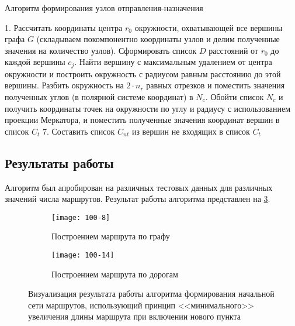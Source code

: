 \begin{algorithm}[ht!]
    \label{alg:convex-hull}
    \caption{Алгоритм формирования узлов отправления-назначения}
    1. Рассчитать координаты центра \( r_0 \) окружности, охватывающей все вершины графа \( G \) (складываем 
        покомпонентно координаты узлов и делим полученные значения на количество узлов). Сформировать список \( D \) расстояний от \( r_0 \) до каждой вершины \( c_j \). Найти вершину с максимальным удалением от центра окружности и построить окружность с радиусом 
        равным расстоянию до этой вершины. Разбить окружность на \( 2\cdot n_r \) равных отрезков и поместить значения полученных 
        углов (в полярной системе координат) в \( N_c \). Обойти список \( N_c \) и получить координаты точек на окружности по углу и радиусу с 
        использованием проекции Меркатора, и поместить полученные значения координат вершин в 
        список \( C_t \)\;
    7. Составить список \( C_{nt} \) из вершин не входящих в список \( C_t \)\;
\end{algorithm}

\subsection{Результаты работы}
Алгоритм был апробирован на различных тестовых данных для различных значений числа маршрутов. Результат 
работы алгоритма представлен на \ref{img:min-length-01}.
\begin{figure}[h!]
    \centering
    \begin{subfigure}{0.75\textwidth}
        \texttt{[image: 100-8]}
        \caption{Построением маршрута по графу}
        \label{fig:graph}
    \end{subfigure}
    \begin{subfigure}{0.75\textwidth}
        \texttt{[image: 100-14]}
        \caption{Построением маршрута по дорогам}
        \label{fig:osrm}
    \end{subfigure}
    \caption{Визуализация результата работы алгоритма формирования начальной сети маршрутов, 
        использующий принцип <<минимального>> увеличения длины маршрута при включении нового пункта%
    }
   \label{img:min-length-01}
\end{figure}

